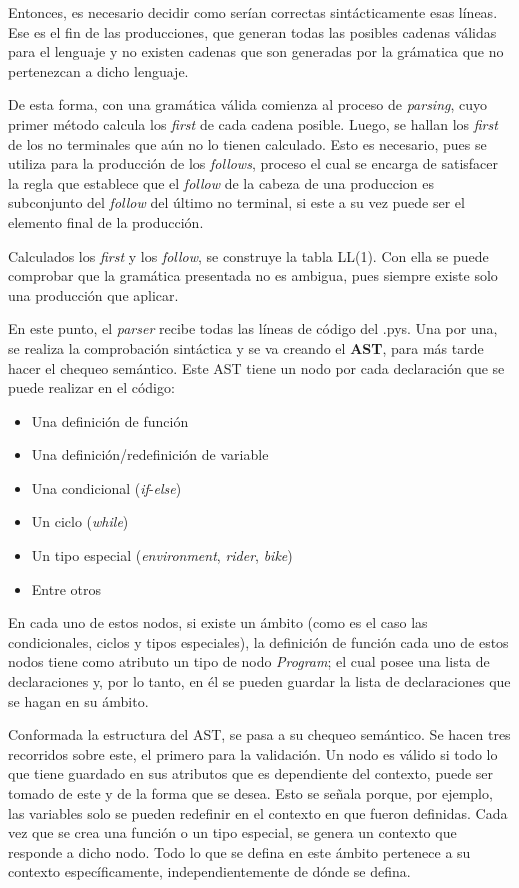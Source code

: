 \documentclass[12pt, letterpaper,spanish]{article}
\theoremstyle{definition}
\theoremstyle{remark}
\begin{document}
	Entonces, es necesario decidir como serían correctas sintácticamente esas líneas. Ese es el fin de las producciones, que generan todas las posibles cadenas válidas para el lenguaje y no existen cadenas que son generadas por la grámatica que no pertenezcan a dicho lenguaje.

	De esta forma, con una gramática válida comienza al proceso de \emph{parsing}, cuyo primer método calcula los \emph{first} de cada cadena posible. Luego, se hallan los \emph{first} de los no terminales que aún no lo tienen calculado. Esto es necesario, pues se utiliza para la producción de los \emph{follows}, proceso el cual se encarga de satisfacer la regla que establece que el \emph{follow} de la cabeza de una produccion es subconjunto del \emph{follow} del último no terminal, si este a su vez puede ser el elemento final de la producción.

        Calculados los \emph{first} y los \emph{follow}, se construye la tabla LL(1). Con ella se puede comprobar que la gramática presentada no es ambigua, pues siempre existe solo una producción que aplicar. 

	En este punto, el \emph{parser} recibe todas las líneas de código del .pys. Una por una, se realiza la comprobación sintáctica y se va creando el \textbf{AST}, para más tarde hacer el chequeo semántico. Este AST tiene un nodo por cada declaración que se puede realizar en el código:
	\begin{itemize}
		\item Una definición de función
		\item Una definición/redefinición de variable
		\item Una condicional (\emph{if}-\emph{else})
		\item Un ciclo (\emph{while})
		\item Un tipo especial (\emph{environment}, \emph{rider}, \emph{bike})
		\item Entre otros
	\end{itemize}

	En cada uno de estos nodos, si existe un ámbito (como es el caso las condicionales, ciclos y tipos especiales), la definición de función cada uno de estos nodos tiene como atributo un tipo de nodo \emph{Program}; el cual posee una lista de declaraciones y, por lo tanto, en él se pueden guardar la lista de declaraciones que se hagan en su ámbito.

        Conformada la estructura del AST, se pasa a su chequeo semántico. Se hacen tres recorridos sobre este, el primero para la validación. Un nodo es válido si todo lo que tiene guardado en sus atributos que es dependiente del contexto, puede ser tomado de este y de la forma que se desea. Esto se señala porque, por ejemplo, las variables solo se pueden redefinir en el contexto en que fueron definidas. Cada vez que se crea una función o un tipo especial, se genera un contexto que responde a dicho nodo. Todo lo que se defina en este ámbito pertenece a su contexto específicamente, independientemente de dónde se defina. 
\end{document}
